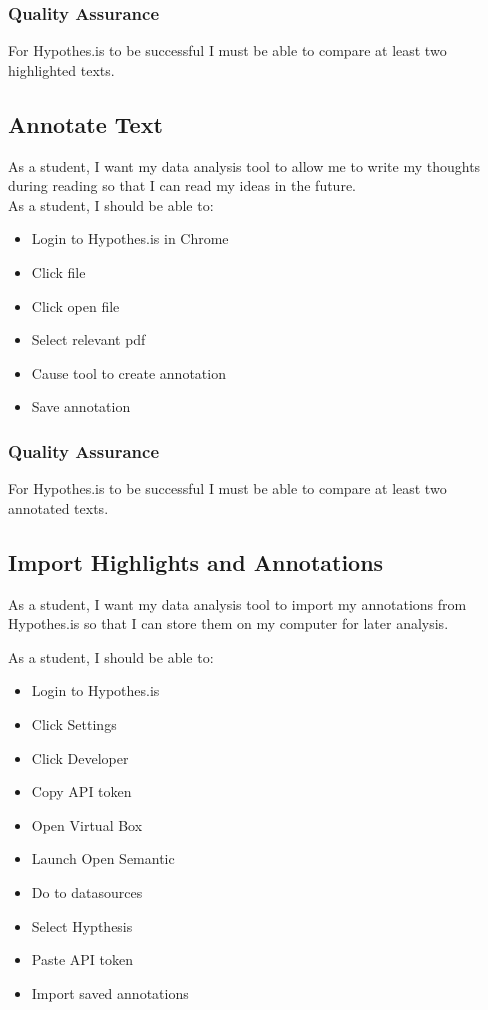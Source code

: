 \documentclass{article}
\begin{document}
\subsubsection{Quality Assurance} 
For Hypothes.is to be successful I must be able to compare at least two highlighted texts.

\subsection{Annotate Text}
As a student, I want my data analysis tool to allow me to write my thoughts during reading so that I can read my ideas in the future.\\

As a student, I should be able to:
\begin{itemize}
    \item Login to Hypothes.is in Chrome
    \item Click file
    \item Click open file 
    \item Select relevant pdf
    \item Cause tool to create annotation
    \item Save annotation 
\end{itemize}

\subsubsection{Quality Assurance}
For Hypothes.is to be successful I must be able to compare at least two annotated texts.

\subsection{Import Highlights and Annotations}
As a student, I want my data analysis tool to import my annotations from Hypothes.is so that I can store them on my computer for later analysis.

As a student, I should be able to:
\begin{itemize}
    \item Login to Hypothes.is 
    \item Click Settings
    \item Click Developer 
    \item Copy API token 
    \item Open Virtual Box 
    \item Launch Open Semantic 
    \item Do to datasources
    \item Select Hypthesis
    \item Paste API token 
    \item Import saved annotations
\end{itemize}
\end{document}
